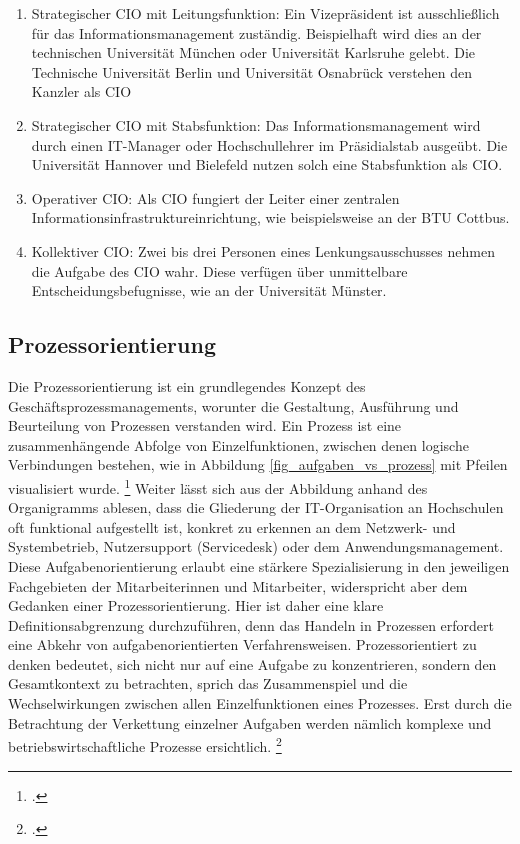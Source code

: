 \begin{enumerate}
	\item Strategischer CIO mit Leitungsfunktion: Ein Vizepräsident ist ausschließlich für das Informationsmanagement zuständig. Beispielhaft wird dies an der technischen Universität München oder Universität Karlsruhe gelebt. Die Technische Universität Berlin und Universität Osnabrück verstehen den Kanzler als CIO
	\item Strategischer CIO mit Stabsfunktion: Das Informationsmanagement wird durch einen IT-Manager oder Hochschullehrer im Präsidialstab ausgeübt. Die Universität Hannover und Bielefeld nutzen solch eine Stabsfunktion als CIO.
	\item Operativer CIO: Als CIO fungiert der Leiter einer zentralen Informationsinfrastruktureinrichtung, wie beispielsweise an der BTU Cottbus.
	\item Kollektiver CIO: Zwei bis drei Personen eines Lenkungsausschusses nehmen die Aufgabe des CIO wahr. Diese verfügen über unmittelbare Entscheidungsbefugnisse, wie an der Universität Münster.
\end{enumerate}


\subsection{Prozessorientierung}
\label{subsection_prozessorientierung}
Die Prozessorientierung ist ein grundlegendes Konzept des Geschäftsprozessmanagements, worunter die Gestaltung, Ausführung und Beurteilung von Prozessen verstanden wird. Ein Prozess ist eine zusammenhängende Abfolge von Einzelfunktionen, zwischen denen logische Verbindungen bestehen, wie in Abbildung \ref{fig_aufgaben_vs_prozess} mit Pfeilen visualisiert wurde. \footcite[Vgl.][60]{krcmar_einfuhrung_2015} Weiter lässt sich aus der Abbildung anhand des Organigramms ablesen, dass die Gliederung der IT-Organisation an Hochschulen oft funktional aufgestellt ist, konkret zu erkennen an dem Netzwerk- und Systembetrieb, Nutzersupport (Servicedesk) oder dem Anwendungsmanagement. Diese Aufgabenorientierung erlaubt eine stärkere Spezialisierung in den jeweiligen Fachgebieten der Mitarbeiterinnen und Mitarbeiter, widerspricht aber dem Gedanken einer Prozessorientierung. Hier ist daher eine klare Definitionsabgrenzung durchzuführen, denn das Handeln in Prozessen erfordert eine Abkehr von aufgabenorientierten Verfahrensweisen. Prozessorientiert zu denken bedeutet, sich nicht nur auf eine Aufgabe zu konzentrieren, sondern den Gesamtkontext zu betrachten, sprich das Zusammenspiel und die Wechselwirkungen zwischen allen Einzelfunktionen eines Prozesses. Erst durch die Betrachtung der Verkettung einzelner Aufgaben werden nämlich komplexe und betriebswirtschaftliche Prozesse ersichtlich. \footcite[Vgl.][274]{heinrich_stelzer_2011}



